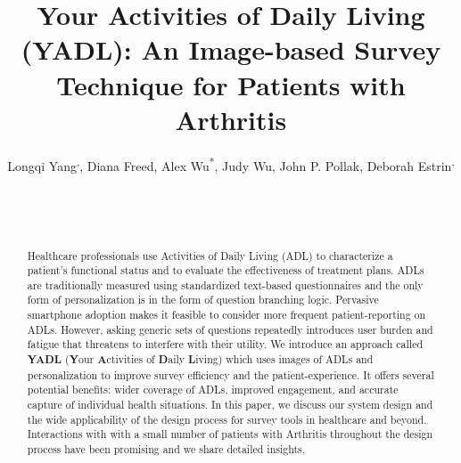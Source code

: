 \documentclass{sig-alternate-05-2015}
\begin{document}
\toappear{} 











\title{Your Activities of Daily Living (YADL):  An Image-based Survey Technique for Patients with Arthritis}




\vspace{-3mm}


\author{
Longqi Yang\textsuperscript{\textdagger,}, Diana Freed\textsuperscript{}, Alex Wu\textsuperscript{*}, Judy Wu\textsuperscript{}, John P. Pollak\textsuperscript{}, Deborah Estrin\textsuperscript{\textdagger,}\\
 \\
\\
\\
}

\vspace{-3mm}



\maketitle


\begin{abstract}
Healthcare professionals use Activities of Daily Living (ADL) to characterize a patient's functional status and to evaluate the effectiveness of treatment plans. ADLs are traditionally measured using standardized text-based questionnaires and the only form of personalization is in the form of question branching logic. Pervasive smartphone adoption makes it feasible to consider more frequent patient-reporting on ADLs. However, asking generic sets of questions repeatedly introduces user burden and fatigue that threatens to interfere with their utility. We introduce an approach called \textbf{YADL} (\textbf{Y}our \textbf{A}ctivities of \textbf{D}aily \textbf{L}iving) which uses images of ADLs and personalization to improve survey efficiency and the patient-experience. It offers several potential benefits: wider coverage of ADLs, improved engagement, and accurate capture of individual health situations. In this paper, we discuss our system design and the wide applicability of the design process for survey tools in healthcare and beyond. Interactions with  with a small number of patients with Arthritis throughout the design process have been promising and we share  detailed insights.
\end{abstract}
\vspace{-3mm}
\end{document}
